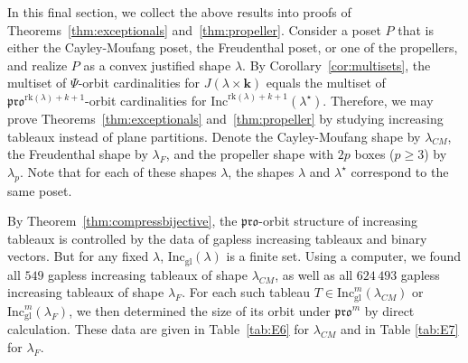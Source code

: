 \documentclass[12pt]{amsart}
\theoremstyle{definition}
\theoremstyle{remark}
\numberwithin{equation}{section}
\newcommand{\inc}{\ensuremath{\mathrm{Inc}}}
\newcommand{\incgl}{\inc_{\mathrm{gl}}}
\newcommand{\pro}{\mathfrak{pro}}
\newcommand{\rank}{\ensuremath{\mathrm{rk}}}
\newcommand{\inflate}{\ensuremath{\mathsf{VecInfl}}}
\newcommand{\tinflate}{\ensuremath{\mathsf{Infl}}}
\newcommand{\compress}{\ensuremath{\mathsf{DeflCon}}}
\begin{document}
In this final section, we collect the above results into proofs of Theorems~\ref{thm:exceptionals} and~\ref{thm:propeller}. Consider a poset $P$ that is either the Cayley-Moufang poset, the Freudenthal poset, or one of the propellers, and realize $P$ as a convex justified shape $\lambda$. By Corollary~\ref{cor:multisets},  the multiset of $\Psi$-orbit cardinalities for $J(\lambda \times \mathbf{k})$ equals the multiset of $\pro^{\rank(\lambda)+ k+1}$-orbit cardinalities for $\inc^{ \rank(\lambda)+ k+1}(\lambda^\star)$. Therefore, we may prove Theorems~\ref{thm:exceptionals} and~\ref{thm:propeller} by studying increasing tableaux instead of plane partitions. Denote the Cayley-Moufang shape by $\lambda_{CM}$, the Freudenthal shape by $\lambda_F$, and the propeller shape with $2p$ boxes ($p \geq 3$) by $\lambda_p$. Note that for each of these shapes $\lambda$,  the shapes $\lambda$ and $\lambda^\star$ correspond to the same poset.

By Theorem~\ref{thm:compressbijective}, the $\pro$-orbit structure of increasing tableaux is controlled by the data of gapless increasing tableaux and binary vectors. But for any fixed $\lambda$, $\incgl(\lambda)$ is a finite set. Using a computer, we found all $549$ gapless increasing tableaux of shape $\lambda_{CM}$, as well as all $624\, 493$ gapless increasing tableaux of shape $\lambda_F$. For each such tableau $T \in \incgl^m(\lambda_{CM})$ or $\incgl^m(\lambda_F)$, we then determined the size of its orbit under $\pro^m$ by direct calculation. These data are given in Table~\ref{tab:E6} for $\lambda_{CM}$ and in Table \ref{tab:E7} for $\lambda_F$. 
\end{document}
